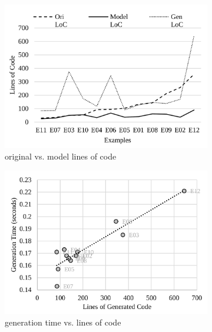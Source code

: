 \documentclass[sigconf]{acmart}
\begin{document}
{	\begin{figure}
		\centering
		\begin{subfigure}{0.33\textwidth}
			\includegraphics[width=\textwidth]{figures/eval-productivity.pdf}
			\caption{original vs. model lines of code}
			\label{fig:eval-productivity}
		\end{subfigure}
		\hfill
		\begin{subfigure}{0.33\textwidth}
			\includegraphics[width=\textwidth]{figures/eval-generation-time.pdf}
			\caption{generation time vs. lines of code}
			\label{fig:eval-generation-time}
		\end{subfigure}
		\hfill
		\begin{subfigure}{0.33\textwidth}

\end{subfigure}
\end{figure}}
\end{document}
